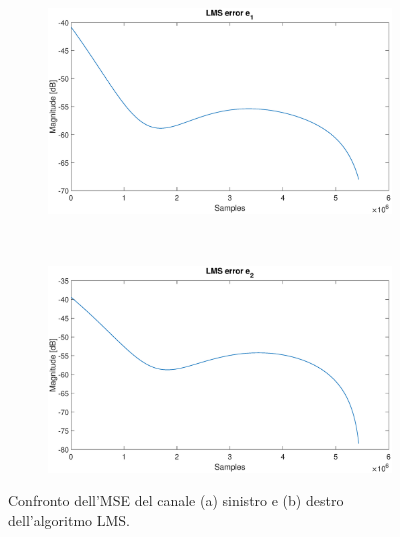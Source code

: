\documentclass[12pt,a4paper,titlepage]{article}
\begin{document}
\begin{figure}[h]
	\begin{subfigure}{1\textwidth}
		\includegraphics[width=1\textwidth]{Immagini/mse_e1}
		\caption{}
		\label{mse_e1}
	\end{subfigure}\\
	\begin{subfigure}{1\textwidth}
		\includegraphics[width=1\textwidth]{Immagini/mse_e2}
		\caption{}
		\label{mse_e2}
	\end{subfigure}
	\caption{Confronto dell'MSE del canale (a) sinistro e (b) destro dell'algoritmo LMS.}
	\label{fig:mse_LMS}
\end{figure}
\end{document}
